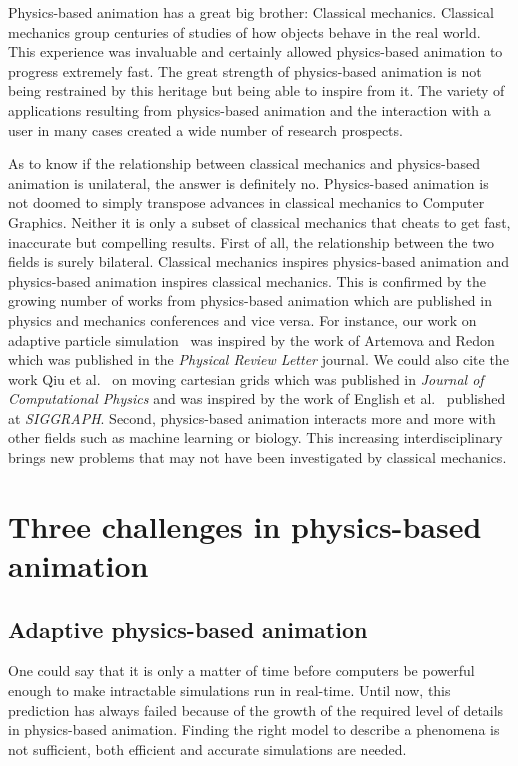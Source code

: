 Physics-based animation has a great big brother: Classical mechanics. Classical mechanics group centuries of studies of how objects behave in the real world. This experience was invaluable and certainly allowed physics-based animation to progress extremely fast. The great strength of physics-based animation is not being restrained by this heritage but being able to inspire from it. The variety of applications resulting from physics-based animation and the interaction with a user in many cases  created a wide number of research prospects.

As to know if the relationship between classical mechanics and physics-based animation is unilateral, the answer is definitely no. Physics-based animation is not doomed to simply transpose advances in classical mechanics to Computer Graphics. Neither it is only a subset of classical mechanics that cheats to get fast, inaccurate but compelling results. 
First of all, the relationship between the two fields is surely bilateral. Classical mechanics inspires physics-based animation and physics-based animation inspires classical mechanics. 
This is confirmed by the growing number of works from physics-based animation which are published in physics and mechanics conferences and vice versa.
For instance, our work on adaptive particle simulation~\cite{Manteaux2013} was inspired by the work of Artemova and Redon~\cite{Artemova2012} which was published in the \emph{Physical Review Letter} journal.
We could also cite the work Qiu et al.~\cite{Qiu2016} on moving cartesian grids which was published in \emph{Journal of Computational Physics} and was inspired by the work of English et al.~\cite{English2013} published at \emph{SIGGRAPH}.
Second, physics-based animation interacts more and more with other fields such as machine learning or biology. This increasing interdisciplinary brings new problems that may not have been investigated by classical mechanics. 

\section{Three challenges in physics-based animation}

\subsection{Adaptive physics-based animation}
One could say that it is only a matter of time before computers be powerful enough to make intractable simulations run in real-time. Until now, this prediction has always failed because of the growth of the required level of details in physics-based animation. Finding the right model to describe a phenomena is not sufficient, both efficient and accurate simulations are needed.

